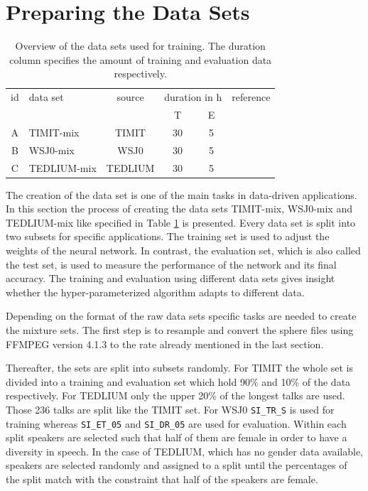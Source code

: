 \section{Preparing the Data Sets}\label{sec.preparing-datasets}

\begin{table}
	\centering
	\begin{tabularx}{.8\textwidth}{cXcccc}
		id & data set    & source  & \multicolumn{2}{c}{duration in h} & reference 	\tabularnewline
		   &             &         & T                                 & E                         & \tabularnewline
		\midrule
		A  & TIMIT-mix   & TIMIT   & 30                                & 5                         & \cite{Garofolo1993} \tabularnewline
		\midrule
		B  & WSJ0-mix    & WSJ0    & 30                                & 5                         & \cite{Garofolo1994} \tabularnewline
		\midrule
		C  & TEDLIUM-mix & TEDLIUM & 30                                & 5                         & \cite{Hernandez2018} \tabularnewline
	\end{tabularx}
	\caption{Overview of the data sets used for training. The duration column specifies the amount of training and evaluation data respectively.}
	\label{table.datasets}
\end{table}

The creation of the data set is one of the main tasks in data-driven applications. In this section the process of creating the data sets TIMIT-mix, WSJ0-mix and TEDLIUM-mix like specified in Table \ref{table.datasets} is presented. Every data set is split into two subsets for specific applications. The training set is used to adjust the weights of the neural network. In contrast, the evaluation set, which is also called the test set, is used to measure the performance of the network and its final accuracy.
The training and evaluation using different data sets gives insight whether the hyper-parameterized algorithm adapts to different data.

Depending on the format of the raw data sets specific tasks are needed to create the mixture sets. The first step is to resample and convert the \gls{sphere} files using FFMPEG version 4.1.3 to the rate already mentioned in the last section.

Thereafter, the sets are split into subsets randomly.
For TIMIT the whole set is divided into a training and evaluation set which hold 90\% and 10\% of the data respectively.
For TEDLIUM only the upper 20\% of the longest talks are used. Those 236 talks are split like the TIMIT set.
For WSJ0 \texttt{SI\_TR\_S} is used for training whereas \texttt{SI\_ET\_05} and \texttt{SI\_DR\_05} are used for evaluation.
Within each split speakers are selected such that half of them are female in order to have a diversity in speech. In the case of TEDLIUM, which has no gender data available, speakers are selected randomly and assigned to a split until the percentages of the split match with the constraint that half of the speakers are female.

